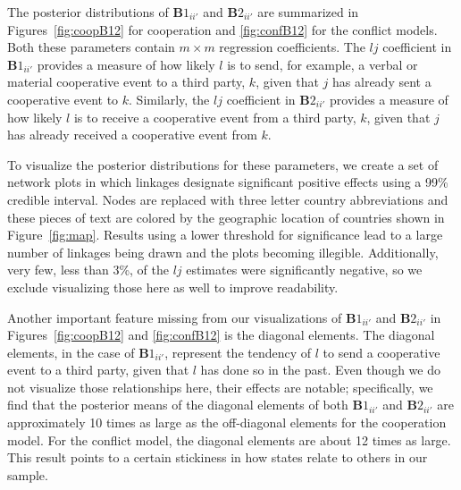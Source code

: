 \documentclass[3p,times,twocolumn,authoryear,12pt]{elsarticle}
\newcommand{\bl}[1]{{\mathbf #1}}
\begin{document}

The posterior distributions of $\bl B1_{ii'}$ and $\bl B2_{ii'}$ are summarized in Figures~\ref{fig:coopB12} for cooperation and \ref{fig:confB12} for the conflict models. Both these parameters contain $m \times m$ regression coefficients. The $lj$ coefficient in $\bl B1_{ii'}$ provides a measure of how likely $l$ is to send, for example, a verbal or material cooperative event to a third party, $k$, given that $j$ has already sent a cooperative event to $k$. Similarly, the $lj$ coefficient in $\bl B2_{ii'}$ provides a measure of how likely $l$ is to receive a cooperative event from a third party, $k$, given that $j$ has already received a cooperative event from $k$. 


To visualize the posterior distributions for these parameters, we create a set of network plots in which linkages designate significant positive effects using a 99\% credible interval. Nodes are replaced with three letter country abbreviations and these pieces of text are colored by the geographic location of countries shown in Figure~\ref{fig:map}. Results using a lower threshold for significance lead to a large number of linkages being drawn and the plots becoming illegible. Additionally, very few, less than 3\%, of the $lj$ estimates were significantly negative, so we exclude visualizing those here as well to improve readability. 

Another important feature missing from our visualizations of $\bl B1_{ii'}$ and $\bl B2_{ii'}$ in Figures~\ref{fig:coopB12} and \ref{fig:confB12} is the diagonal elements. The diagonal elements, in the case of $\bl B1_{ii'}$, represent the tendency of $l$ to send a cooperative event to a third party, given that $l$ has done so in the past. Even though we do not visualize those relationships here, their effects are notable; specifically, we find that the posterior means of the diagonal elements of both $\bl B1_{ii'}$ and $\bl B2_{ii'}$ are approximately 10 times as large as the off-diagonal elements for the cooperation model. For the conflict model, the diagonal elements are about 12 times as large. This result points to a certain stickiness in how states relate to others in our sample. 
\end{document}

